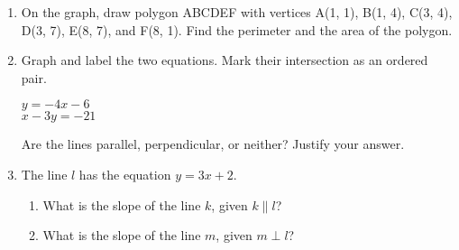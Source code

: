 \documentclass[12pt, twoside]{article}
\begin{document}
\begin{enumerate}
\item On the graph, draw polygon ABCDEF with vertices A(1, 1), B(1, 4), C(3, 4), D(3, 7), E(8, 7), and F(8, 1). Find the perimeter and the area of the polygon.\\[1cm]
  \vspace{2cm}

\newpage
\item Graph and label the two equations. Mark their intersection as an ordered pair.
  \begin{multicols}{2}
    $y = -4x-6$ \\
    $x-3y = -21$
  \end{multicols}  \vspace{1cm}
  Are the lines parallel, perpendicular, or neither? Justify your answer.
  \vspace{1.5cm}
  \begin{center} %
  \end{center}

\item The line $l$ has the equation $y= 3x+2$.
  \begin{enumerate}
    \item What is the slope of the line $k$, given $k \parallel l$?
    \vspace{1cm}
    \item What is the slope of the line $m$, given $m \perp l$?
    \vspace{1cm}
  \end{enumerate}


\end{enumerate}
\end{document}
